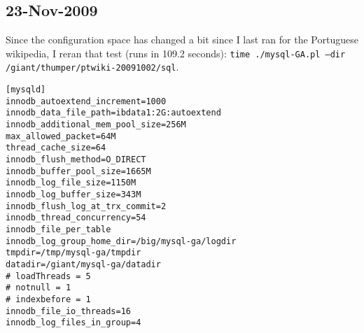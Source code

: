 \subsection{23-Nov-2009}

Since the configuration space has changed a bit since I last ran for
the Portuguese wikipedia, I reran that test (runs in 109.2 seconds):
\texttt{time ./mysql-GA.pl --dir /giant/thumper/ptwiki-20091002/sql}.

\begin{verbatim}
[mysqld]
innodb_autoextend_increment=1000
innodb_data_file_path=ibdata1:2G:autoextend
innodb_additional_mem_pool_size=256M
max_allowed_packet=64M
thread_cache_size=64
innodb_flush_method=O_DIRECT
innodb_buffer_pool_size=1665M
innodb_log_file_size=1150M
innodb_log_buffer_size=343M
innodb_flush_log_at_trx_commit=2
innodb_thread_concurrency=54
innodb_file_per_table
innodb_log_group_home_dir=/big/mysql-ga/logdir
tmpdir=/tmp/mysql-ga/tmpdir
datadir=/giant/mysql-ga/datadir
# loadThreads = 5
# notnull = 1
# indexbefore = 1
innodb_file_io_threads=16
innodb_log_files_in_group=4
\end{verbatim}

